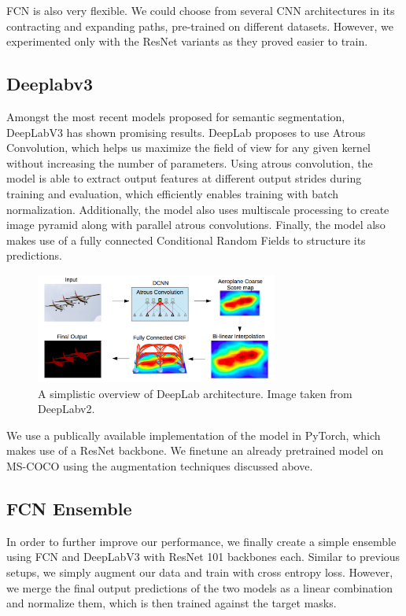 FCN is also very flexible. We could choose from several CNN architectures in its contracting and expanding paths, pre-trained on different datasets. However, we experimented only with the ResNet variants as they proved easier to train.


\subsection{Deeplabv3} \label{subsec:deeplab}
Amongst the most recent models proposed for semantic segmentation, DeepLabV3 has shown promising results. DeepLab proposes to use Atrous Convolution, which helps us maximize the field of view for any given kernel without increasing the number of parameters. Using atrous convolution, the model is able to extract output features at different output strides during training and evaluation, which efficiently enables training with batch normalization. Additionally, the model also uses multiscale processing to create image pyramid along with parallel atrous convolutions. Finally, the model also makes use of a fully connected Conditional Random Fields to structure its predictions. 

\begin{figure}[h]
\includegraphics[width=8cm]{images/deeplabv2.png}
\caption{A simplistic overview of DeepLab architecture. Image taken from DeepLabv2. \cite{deeplab2}}
\end{figure}

We use a publically available implementation of the model in PyTorch, which makes use of a ResNet backbone. We finetune an already pretrained model on MS-COCO using the augmentation techniques discussed above. 

\subsection{FCN Ensemble} \label{subsec:ensemble}
In order to further improve our performance, we finally create a simple ensemble using FCN and DeepLabV3 with ResNet 101 backbones each. Similar to previous setups, we simply augment our data and train with cross entropy loss. However, we merge the final output predictions of the two models as a linear combination and normalize them, which is then trained against the target masks.
